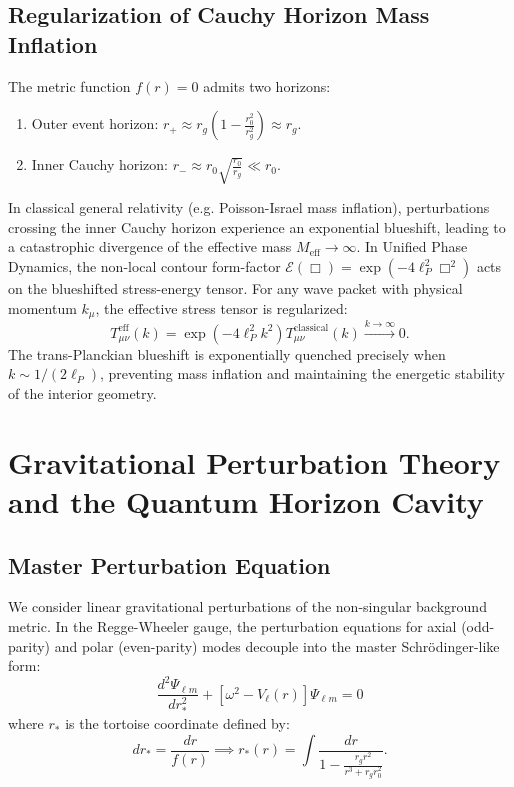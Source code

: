 \documentclass[11pt,a4paper]{article}
\begin{document}
\subsection{Regularization of Cauchy Horizon Mass Inflation}
The metric function $f(r) = 0$ admits two horizons:
\begin{enumerate}
    \item Outer event horizon: $r_+ \approx r_g \left(1 - \frac{r_0^2}{r_g^2}\right) \approx r_g$.
    \item Inner Cauchy horizon: $r_- \approx r_0 \sqrt{\frac{r_0}{r_g}} \ll r_0$.
\end{enumerate}
In classical general relativity (e.g. Poisson-Israel mass inflation), perturbations crossing the inner Cauchy horizon experience an exponential blueshift, leading to a catastrophic divergence of the effective mass $M_{\mathrm{eff}} \to \infty$. In Unified Phase Dynamics, the non-local contour form-factor $\mathcal{E}(\Box) = \exp(-4\ell_P^2 \Box^2)$ acts on the blueshifted stress-energy tensor. For any wave packet with physical momentum $k_\mu$, the effective stress tensor is regularized:
\begin{equation}
T_{\mu\nu}^{\mathrm{eff}}(k) = \exp(-4\ell_P^2 k^2) T_{\mu\nu}^{\mathrm{classical}}(k) \xrightarrow{k \to \infty} 0.
\end{equation}
The trans-Planckian blueshift is exponentially quenched precisely when $k \sim 1/(2\ell_P)$, preventing mass inflation and maintaining the energetic stability of the interior geometry.

\section{Gravitational Perturbation Theory and the Quantum Horizon Cavity}

\subsection{Master Perturbation Equation}
We consider linear gravitational perturbations of the non-singular background metric. In the Regge-Wheeler gauge, the perturbation equations for axial (odd-parity) and polar (even-parity) modes decouple into the master Schr\"odinger-like form:
\begin{equation}
\frac{d^2 \Psi_{\ell m}}{dr_*^2} + \left[ \omega^2 - V_{\ell}(r) \right] \Psi_{\ell m} = 0
\end{equation}
where $r_*$ is the tortoise coordinate defined by:
\begin{equation}
dr_* = \frac{dr}{f(r)} \implies r_*(r) = \int \frac{dr}{1 - \frac{r_g r^2}{r^3 + r_g r_0^2}}.
\end{equation}
\end{document}
